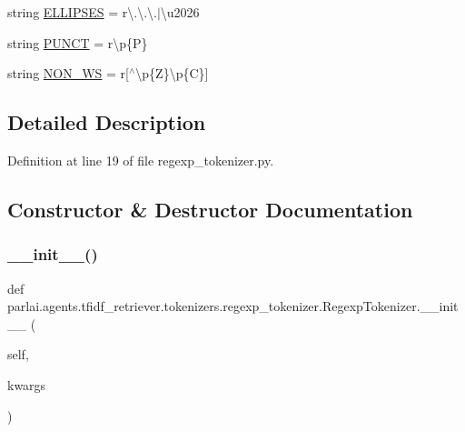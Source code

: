 \begin{DoxyCompactItemize}
\item 
string \hyperlink{classparlai_1_1agents_1_1tfidf__retriever_1_1tokenizers_1_1regexp__tokenizer_1_1RegexpTokenizer_add447e9e9c8fcd85a4e1f32b30f8f314}{E\+L\+L\+I\+P\+S\+ES} = r\textquotesingle{}\textbackslash{}.\textbackslash{}.\textbackslash{}.$\vert$\textbackslash{}u2026\textquotesingle{}
\item 
string \hyperlink{classparlai_1_1agents_1_1tfidf__retriever_1_1tokenizers_1_1regexp__tokenizer_1_1RegexpTokenizer_af837a628caa159704dfb2c565d8d378c}{P\+U\+N\+CT} = r\textquotesingle{}\textbackslash{}p\{P\}\textquotesingle{}
\item 
string \hyperlink{classparlai_1_1agents_1_1tfidf__retriever_1_1tokenizers_1_1regexp__tokenizer_1_1RegexpTokenizer_aba405571ab950ec93b3c92f87ff4aa6a}{N\+O\+N\+\_\+\+WS} = r\textquotesingle{}\mbox{[}$^\wedge$\textbackslash{}p\{Z\}\textbackslash{}p\{C\}\mbox{]}\textquotesingle{}
\end{DoxyCompactItemize}


\subsection{Detailed Description}


Definition at line 19 of file regexp\+\_\+tokenizer.\+py.



\subsection{Constructor \& Destructor Documentation}
\mbox{\label{classparlai_1_1agents_1_1tfidf__retriever_1_1tokenizers_1_1regexp__tokenizer_1_1RegexpTokenizer_af18fd6e3cb635cf6a05f32b90fb51fcc}} 
\subsubsection{\texorpdfstring{\+\_\+\+\_\+init\+\_\+\+\_\+()}{\_\_init\_\_()}}
{\footnotesize\ttfamily def parlai.\+agents.\+tfidf\+\_\+retriever.\+tokenizers.\+regexp\+\_\+tokenizer.\+Regexp\+Tokenizer.\+\_\+\+\_\+init\+\_\+\+\_\+ (\begin{DoxyParamCaption}\item[{}]{self,  }\item[{}]{kwargs }\end{DoxyParamCaption})}


